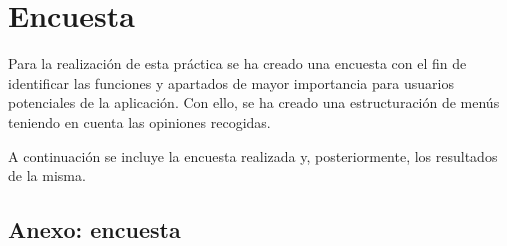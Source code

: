 \documentclass[a4paper]{article}
\begin{document}
\section{Encuesta}
 Para la realización de esta práctica se ha creado una encuesta con el fin de identificar las funciones y apartados de mayor importancia para usuarios potenciales de la aplicación. Con ello, se ha creado una estructuración de menús teniendo en cuenta las opiniones recogidas.
 
 A continuación se incluye la encuesta realizada y, posteriormente, los resultados de la misma.
 
 \subsection{Anexo: encuesta}
 
\end{document}
